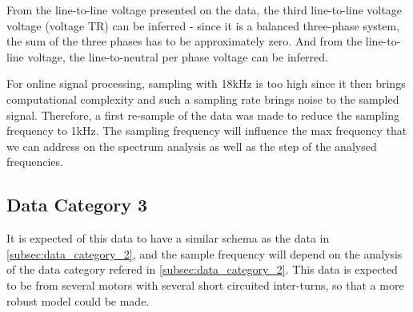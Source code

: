 From the line-to-line voltage presented on the data, the third line-to-line voltage voltage (voltage TR) can be inferred - since it is a balanced three-phase system, the sum of the three phases has to be approximately zero. And from the line-to-line voltage, the line-to-neutral per phase voltage can be inferred.

For online signal processing, sampling with 18kHz is too high since it then brings computational complexity and such a sampling rate brings noise to the sampled signal. Therefore, a first re-sample of the data was made to reduce the sampling frequency to 1kHz. The sampling frequency will influence the max frequency that we can address on the spectrum analysis as well as the step of the analysed frequencies.

\subsection{Data Category 3}
\label{subsec:data_category_3}

It is expected of this data to have a similar schema as the data in \ref{subsec:data_category_2}, and the sample frequency will depend on the analysis of the data category refered in \ref{subsec:data_category_2}. This data is expected to be from several motors with several short circuited inter-turns, so that a more robust model could be made.